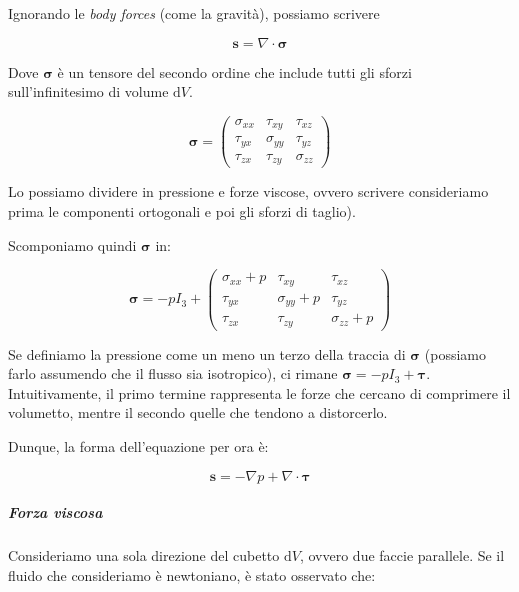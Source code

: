 \documentclass[12pt,a4paper]{article}
\numberwithin{equation}{section}
\begin{document}
Ignorando le \emph{body forces} (come la gravità), possiamo scrivere

\begin{equation}
\mathbf{s} = \nabla \cdot \bm{\sigma}
\end{equation}

Dove $\bm{\sigma}$ è un tensore del secondo ordine che include tutti gli sforzi sull'infinitesimo di volume $\mathrm{d}V$. 

\begin{equation}
\bm{\sigma} = \begin{pmatrix}
\sigma_{xx} &  \tau_{xy} & \tau_{xz} \\
\tau_{yx} &  \sigma_{yy} & \tau_{yz} \\
\tau_{zx} &  \tau_{zy} & \sigma_{zz}
\end{pmatrix}
\end{equation}

Lo possiamo dividere in pressione e forze viscose, ovvero scrivere consideriamo prima le componenti ortogonali e poi gli sforzi di taglio).

Scomponiamo quindi $\bm{\sigma}$ in:

\begin{equation}
\bm{\sigma} = -p I_3 + \begin{pmatrix}
\sigma_{xx} + p &  \tau_{xy} & \tau_{xz} \\
\tau_{yx} &  \sigma_{yy} + p & \tau_{yz} \\
\tau_{zx} &  \tau_{zy} & \sigma_{zz} + p
\end{pmatrix}
\end{equation}

Se definiamo la pressione come un meno un terzo della traccia di $\bm{\sigma}$ (possiamo farlo assumendo che il flusso sia isotropico), ci rimane $\bm{\sigma} = -p I_3 + \bm{\tau}$. Intuitivamente, il primo termine rappresenta le forze che cercano di comprimere il volumetto, mentre il secondo quelle che tendono a distorcerlo.

Dunque, la forma dell'equazione per ora è:

\begin{equation}
\mathbf{s} = - \nabla p + \nabla \cdot \bm{\tau}
\end{equation}

\subparagraph{Forza viscosa}

Consideriamo una sola direzione del cubetto $\mathrm{d} V$, ovvero due faccie parallele. Se il fluido che consideriamo è newtoniano, è stato osservato che:
\end{document}
